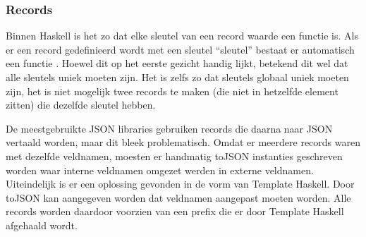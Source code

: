 \subsubsection{Records} 
Binnen Haskell is het zo dat elke sleutel van een record waarde een functie is. Als er een record gedefinieerd wordt met een sleutel ``sleutel'' bestaat er automatisch een functie . Hoewel dit op het eerste gezicht handig lijkt, betekend dit wel dat alle sleutels uniek moeten zijn. Het is zelfs zo dat sleutels globaal uniek moeten zijn, het is niet mogelijk twee records te maken (die niet in hetzelfde  element zitten) die dezelfde sleutel hebben.

De meestgebruikte JSON libraries gebruiken records die daarna naar JSON vertaald worden, maar dit bleek problematisch. Omdat er meerdere records waren met dezelfde veldnamen, moesten er handmatig toJSON instanties geschreven worden waar interne veldnamen omgezet werden in externe veldnamen. Uiteindelijk is er een oplossing gevonden in de vorm van Template Haskell. Door toJSON kan aangegeven worden dat veldnamen aangepast moeten worden. Alle records worden daardoor voorzien van een prefix die er door Template Haskell afgehaald wordt.


